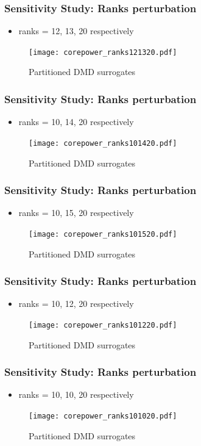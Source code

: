 \documentclass[fleqn]{beamer}
\begin{document}
\begin{frame}
\frametitle{Sensitivity Study: Ranks perturbation}
\begin{itemize}
 \item ranks = 12, 13, 20 respectively
\end{itemize}

\begin{figure}[ht]

\texttt{[image: corepower\_ranks121320.pdf]}
\caption{Partitioned DMD surrogates}
\end{figure}
\end{frame}


\begin{frame}
\frametitle{Sensitivity Study: Ranks perturbation}
\begin{itemize}
 \item ranks = 10, 14, 20 respectively
\end{itemize}
\begin{figure}[ht]
\texttt{[image: corepower\_ranks101420.pdf]}
\caption{Partitioned DMD surrogates}
\end{figure}
\end{frame}

\begin{frame}
\frametitle{Sensitivity Study: Ranks perturbation}
\begin{itemize}
 \item ranks = 10, 15, 20 respectively
\end{itemize}
\begin{figure}[ht]
\texttt{[image: corepower\_ranks101520.pdf]}
\caption{Partitioned DMD surrogates}
\end{figure}
\end{frame}

\begin{frame}
\frametitle{Sensitivity Study: Ranks perturbation}
\begin{itemize}
 \item ranks = 10, 12, 20 respectively
\end{itemize}
\begin{figure}[ht]
\texttt{[image: corepower\_ranks101220.pdf]}
\caption{Partitioned DMD surrogates}
\end{figure}
\end{frame}

\begin{frame}
\frametitle{Sensitivity Study: Ranks perturbation}
\begin{itemize}
 \item ranks = 10, 10, 20 respectively
\end{itemize}
\begin{figure}[ht]
\texttt{[image: corepower\_ranks101020.pdf]}
\caption{Partitioned DMD surrogates}
\end{figure}
\end{frame}
\end{document}
